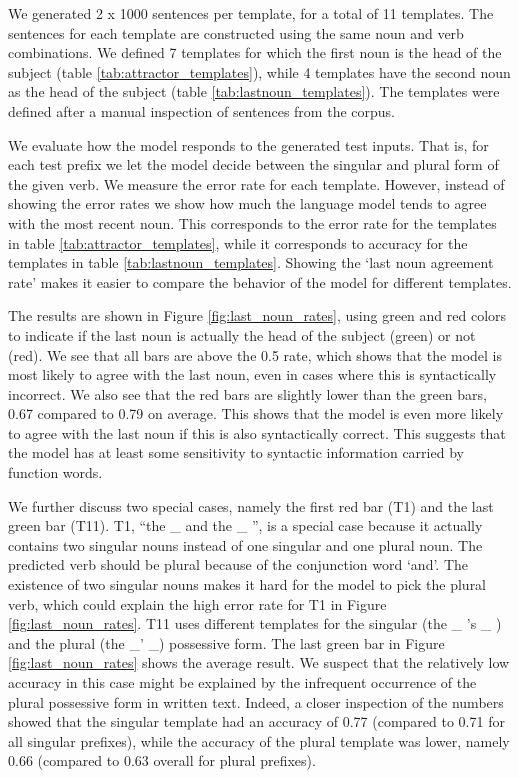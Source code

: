 We generated 2 x 1000 sentences per template,
for a total of 11 templates.
The sentences for each template are constructed using the same
noun and verb combinations.
We defined 7 templates for which the first noun is 
the head of the subject (table \ref{tab:attractor_templates}),
while 4 templates have the second noun as the head of the subject
(table \ref{tab:lastnoun_templates}).
The templates were defined after a manual inspection
of sentences from the corpus.

We evaluate how the model responds to the generated test inputs.
That is, for each test prefix we let the model decide between 
the singular and plural form of the given verb. 
We measure the error rate for each template.
However, instead of showing the error rates we
show how much the language model tends to agree with the most recent noun.
This corresponds to the error rate for the templates in table \ref{tab:attractor_templates},
while it corresponds to accuracy for the templates in table \ref{tab:lastnoun_templates}.
Showing the `last noun agreement rate' makes it easier
to compare the behavior of the model for different templates.

The results are shown in Figure \ref{fig:last_noun_rates},
using green and red colors to indicate if 
the last noun is actually the head of the subject (green)
or not (red). 
%
We see that all bars are above the 0.5 rate,
which shows that the model is most
likely to agree with the last noun,
even in cases where this is syntactically incorrect. 
%
We also see that the red bars are slightly
lower than the green bars,
0.67 compared to 0.79 on average.
This shows that the model is even more likely
to agree with the last noun if this is
also syntactically correct.
This suggests that the model has 
at least some sensitivity
to syntactic information carried by function words.
%

%
We further discuss two special cases,
namely the first red bar (T1) and 
the last green bar (T11).
T1, ``the \_ and the \_ '', is a special case because it 
actually contains two singular nouns
instead of one singular and one plural noun. 
The predicted verb should be plural because of the
conjunction word `and'.
The existence of two singular nouns 
makes it hard for the model
to pick the plural verb,
which could explain the high error rate
for T1 in Figure \ref{fig:last_noun_rates}.
%
T11 uses different templates for the singular 
(the \_ 's \_ ) and the plural (the \_' \_) possessive form.
The last green bar in Figure \ref{fig:last_noun_rates} shows the average result.
We suspect that the relatively low accuracy
in this case might be explained by the infrequent
occurrence of the plural possessive form in written text.
Indeed, a closer inspection of the numbers showed that
the singular template had an accuracy
of 0.77 (compared to 0.71 for all singular prefixes), 
while the accuracy of the plural template
was lower, namely 0.66 (compared to 0.63 overall for plural prefixes).
%

